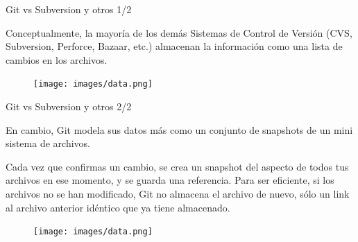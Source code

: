 \documentclass{beamer}
\begin{document}
\begin{frame}{Git vs Subversion y otros 1/2}

    Conceptualmente, la mayoría de los demás Sistemas de Control de Versión
    (CVS, Subversion, Perforce, Bazaar, etc.) almacenan la información
    como una lista de cambios en los archivos.

    \vspace{0.5em}

    \begin{figure}[ht]
        \begin{center}
            \texttt{[image: images/data.png]}
        \end{center}
    \end{figure}

\end{frame}

\begin{frame}{Git vs Subversion y otros 2/2}

     En cambio, Git modela sus datos más como un conjunto de snapshots de un mini sistema de archivos.

     \vspace{0.5em}

     Cada vez que confirmas un cambio, se crea un snapshot del aspecto de todos tus archivos en ese momento, y se guarda una referencia.
     Para ser eficiente, si los archivos no se han modificado, Git no almacena el archivo de nuevo, sólo
     un link al archivo anterior idéntico que ya tiene almacenado.

    \vspace{0.5em}

    \begin{figure}[ht]
        \begin{center}
            \texttt{[image: images/data.png]}
        \end{center}
    \end{figure}

\end{frame}
\end{document}
